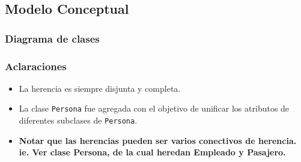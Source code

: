 \subsection{Modelo Conceptual}
\subsubsection{Diagrama de clases}
\subsubsection{Aclaraciones}
\begin{itemize}
	\item La herencia es siempre disjunta y completa.
	\item La clase \texttt{Persona} fue agregada con el objetivo de unificar los atributos de diferentes subclases de \texttt{Persona}.
	\item \textbf{Notar que las herencias pueden ser varios conectivos de herencia. ie. Ver clase Persona, de la cual heredan Empleado y Pasajero.}
\end{itemize}
